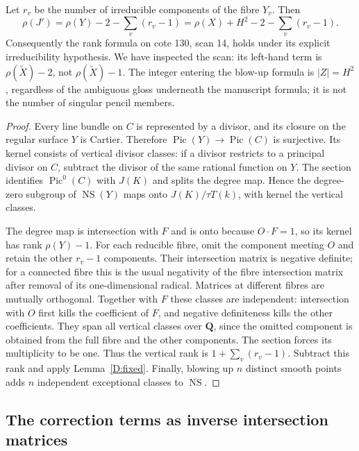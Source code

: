 \begin{theorem}
\label{D:rank}
Let $r_v$ be the number of irreducible components of the fibre $Y_v$.
Then
\[
 \boxed{\rho(J')=\rho(Y)-2-\sum_v(r_v-1)
                 =\rho(X)+H^2-2-\sum_v(r_v-1).}
\]
Consequently the rank formula on cote 130, scan 14, holds under its
explicit irreducibility hypothesis.  We have inspected the scan: its
left-hand term is $\rho(\widetilde X)-2$, not $\rho(\widetilde X)-1$.
The integer entering the blow-up formula is $|Z|=H^2$, regardless of the
ambiguous gloss underneath the manuscript formula; it is not the number
of singular pencil members.
\end{theorem}
\begin{proof}
Every line bundle on $C$ is represented by a divisor, and its closure on
the regular surface $Y$ is Cartier.  Therefore
$\operatorname{Pic}(Y)\to\operatorname{Pic}(C)$ is surjective.
Its kernel consists of vertical divisor classes: if a divisor restricts
to a principal divisor on $C$, subtract the divisor of the same rational
function on $Y$.  The section identifies $\operatorname{Pic}^0(C)$ with
$J(K)$ and splits the degree map.  Hence the degree-zero subgroup of
$\operatorname{NS}(Y)$ maps onto $J(K)/\tau T(k)$, with kernel the
vertical classes.

The degree map is intersection with $F$ and is onto because $O\cdot F=1$,
so its kernel has rank $\rho(Y)-1$.  For each reducible fibre, omit the
component meeting $O$ and retain the other $r_v-1$ components.  Their
intersection matrix is negative definite; for a connected fibre this is
the usual negativity of the fibre intersection matrix after removal of
its one-dimensional radical.  Matrices at different fibres are mutually
orthogonal.  Together with $F$ these classes are independent: intersection
with $O$ first kills the coefficient of $F$, and negative definiteness
kills the other coefficients.  They span all vertical classes over
$\mathbf Q$, since the omitted component is obtained from the full fibre
and the other components.  The section forces its multiplicity to be
one.  Thus the vertical rank is $1+\sum_v(r_v-1)$.  Subtract this rank
and apply Lemma~\ref{D:fixed}.  Finally, blowing up $n$ distinct smooth
points adds $n$ independent exceptional classes to $\operatorname{NS}$.
\end{proof}

\subsection{The correction terms as inverse intersection matrices}

